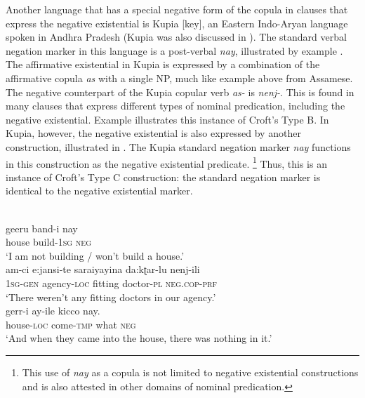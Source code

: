 \documentclass[output=paper]{langsci/langscibook}
\begin{document}
Another language that has a special negative form of the copula in clauses
that express the negative existential is Kupia [key], an Eastern
Indo-Aryan language spoken in Andhra Pradesh (Kupia was also discussed in
).  The standard verbal negation marker in this language is a
post-verbal \textit{nay}, illustrated by example
. The affirmative existential in Kupia is
expressed by a combination of the affirmative copula \textit{as} with a
single NP, much like example  above from
Assamese. The negative counterpart of the Kupia copular verb
\textit{as-} is \textit{nenj-}. This is found in many clauses that express
different types of nominal predication, including the negative existential.
Example  illustrates this instance of Croft's
Type B. In Kupia, however, the negative existential is also
expressed by another construction, illustrated in
. The Kupia standard negation
marker \textit{nay} functions in this construction as the negative
existential predicate.%
%
\footnote{This use of \textit{nay} as a copula is not
limited to negative existential constructions and is also attested in other
domains of nominal predication.} 
%
Thus, this is an instance of Croft's Type C construction: the standard
negation marker is identical to the negative existential marker. 
%
\begin{exe}\ex
\begin{xlist}
    \ex\label{ex:ieur-kupia-buildhouse}
\\
    \gll geeru band-i nay \\
house build-\textsc{1sg} \textsc{neg} \\
    \glt `I am not building / won't build a house.'
\ex\label{ex:ieur-kupia-agency}
  \\
\gll am-ci e:jansi-te saraiyayina da:kʈar-lu   nenj-ili\\
\textsc{1sg}-\textsc{gen} agency-\textsc{loc} fitting doctor-\textsc{pl}
\textsc{neg.cop-prf}\\
\glt `There weren't any fitting doctors in our agency.'
\ex\label{ex:ieur-kupia-emptyhouse}
\\
\gll gerr-i ay-ile kicco nay.\\
house-\textsc{loc} come-\textsc{tmp}   what   \textsc{neg}\\
\glt `And when they came into the house, there was nothing in it.'
\end{xlist}\end{exe}
\end{document}
